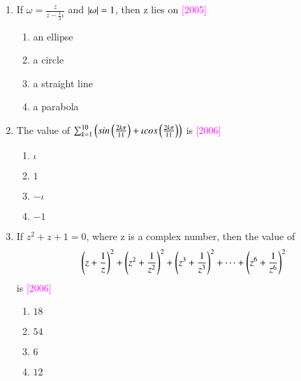 \documentclass[journal,12pt,twocolumn]{IEEEtran}
\theoremstyle{remark}
\begin{document}
\begin{enumerate}
	\item{If $\omega = \frac{z}{z-\frac{1}{3}\iota}$ and $\left\vert\omega\right\vert = 1$, then z lies on \hfill{\textcolor{magenta}{[2005]}}
		\begin{multicols}{2}
		\begin{enumerate}
			\item{an ellipse}
			\item{a circle}
			\columnbreak
			\item{a straight line}
			\item{a parabola}
		\end{enumerate}
		\end{multicols}}

	\item{The value of $\sum_{k=1}^{10}\left(sin\left(\frac{2k\pi}{11}\right)+\iota cos\left(\frac{2k\pi}{11}\right)\right)$ is 
		\hfill{\textcolor{magenta}{[2006]}}
		\begin{multicols}{4}
		\begin{enumerate}
			\item{$\iota$}
			\columnbreak
			\item{$1$}
			\columnbreak
			\item{$-\iota$}
			\columnbreak
			\item{$-1$}
		\end{enumerate}
		\end{multicols}}

	\item{If $z^2 + z + 1 = 0$, where z is a complex number, then the value of $$\left(z+\frac{1}{z}\right)^2 + \left(z^2+\frac{1}{z^2}\right)^2 +\left(z^3+ \frac{1}{z^3}\right)^2 + \dots + \left(z^6+\frac{1}{z^6}\right)^2 $$ is \hfill{\textcolor{magenta}{[2006]}}
		\begin{multicols}{4}
		\begin{enumerate}
			\item{$18$}
			\columnbreak
			\item{$54$}
			\columnbreak
			\item{$6$}
			\columnbreak
			\item{$12$}
		\end{enumerate}
		\end{multicols}}

\end{enumerate}
\end{document}
